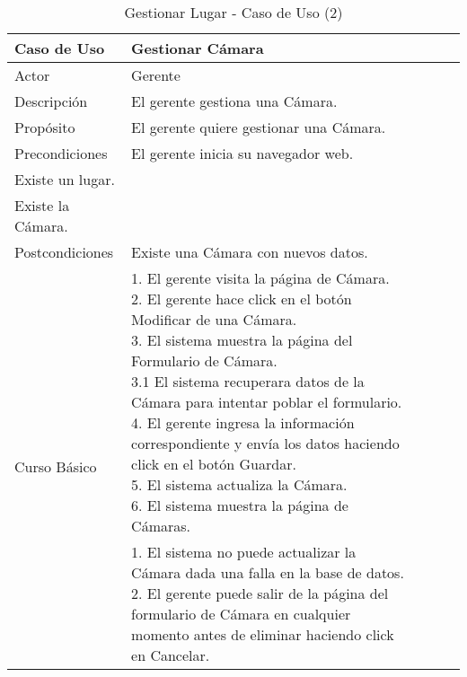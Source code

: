 \begin{table}[H]
    \begin{tabular}{@{} *5l @{}} \toprule
    \textbf{Caso de Uso} & Gestionar Cámara \\ \midrule
    Actor & Gerente \\ 
    Descripción & El gerente gestiona una Cámara. \\ 
    Propósito & El gerente quiere gestionar una Cámara. \\ \midrule
    Precondiciones & El gerente inicia su navegador web. \\ Existe un lugar. \\ Existe la Cámara. \\ \midrule
    Postcondiciones & Existe una Cámara con nuevos datos. \\ \midrule
    \multirow{4}{*}{Curso Básico}
        & \parbox{0.75\linewidth}{ 
                1. El gerente visita la página de Cámara. \\
                2. El gerente hace click en el botón Modificar de una Cámara. \\
                3. El sistema muestra la página del Formulario de Cámara. \\
                    3.1 El sistema recuperara datos de la Cámara para intentar poblar el formulario. \\
                4. El gerente ingresa la información correspondiente y envía los datos haciendo click en el botón Guardar. \\
                5. El sistema actualiza la Cámara.  \\
                6. El sistema muestra la página de Cámaras.   
        } \\ \midrule
        & \parbox{0.75\linewidth}{ 
            1. El sistema no puede actualizar la Cámara dada una falla en la base de datos. \\
            2. El gerente puede salir de la página del formulario de Cámara en cualquier momento antes de eliminar haciendo click en Cancelar.
        }  \\  \bottomrule
     \hline
    \end{tabular}
        \caption{Gestionar Lugar - Caso de Uso (2)}
        \label{tab:tabcu-cam2}
\end{table}


